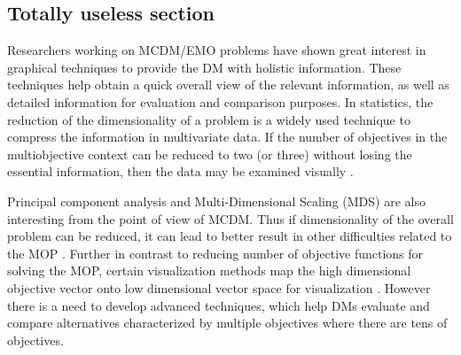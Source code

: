 \subsection{Totally useless section}\label{useless}
Researchers working on MCDM/EMO problems have shown great interest in graphical techniques to provide the DM with holistic information. These techniques help obtain a quick overall view of the relevant information, as well as detailed information for evaluation and comparison purposes. In statistics, the reduction of the dimensionality of a problem is a widely used technique to compress the information in multivariate data. If the number of objectives in the multiobjective context can be reduced to two (or three) without losing the essential information, then the data may be examined visually \cite{Uttal2013}. \par

Principal component analysis and Multi-Dimensional Scaling (MDS) are also interesting from the point of view of MCDM. Thus if dimensionality of the overall problem can be reduced, it can lead to better result in other difficulties related to the MOP \cite{Troussas2023, Voronina2019}. Further in contrast to reducing number of objective functions for solving the MOP, certain visualization methods map the high dimensional objective vector onto low dimensional vector space for visualization \cite{VanLehn2005}. However there is a need to develop advanced techniques, which help DMs evaluate and compare alternatives characterized by multiple objectives where there are tens of objectives.
